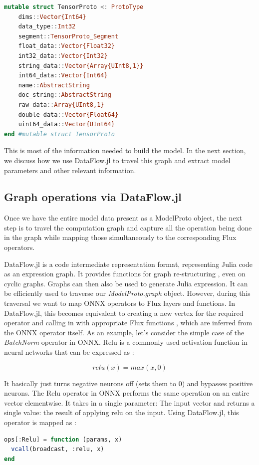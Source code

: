 \documentclass{juliacon}
\begin{document}
\begin{lstlisting}[language=julia]
mutable struct TensorProto <: ProtoType
    dims::Vector{Int64}
    data_type::Int32
    segment::TensorProto_Segment
    float_data::Vector{Float32}
    int32_data::Vector{Int32}
    string_data::Vector{Array{UInt8,1}}
    int64_data::Vector{Int64}
    name::AbstractString
    doc_string::AbstractString
    raw_data::Array{UInt8,1}
    double_data::Vector{Float64}
    uint64_data::Vector{UInt64}
end #mutable struct TensorProto
\end{lstlisting}

This is most of the information needed to build the model. In the next section, we discuss how we use DataFlow.jl to
travel this graph and extract model parameters and other relevant information.

\subsection{Graph operations via DataFlow.jl}

Once we have the entire model data present as a ModelProto object, the next step is to travel the computation 
graph and capture all the operation being done in the graph while mapping those simultaneously to the
corresponding Flux operators.  

DataFlow.jl \cite{DataFlow.jl} is a code intermediate representation format, representing Julia code as an expression graph. It provides functions for graph re-structuring , even on cyclic graphs. Graphs can then also be used to generate Julia expression. It can be efficiently used to traverse our \textit{ModelProto.graph} object. However,
during this traversal we want to map ONNX operators to Flux layers and functions. In DataFlow.jl, this becomes
equivalent to creating a new vertex for the required operator and calling in with appropriate Flux functions
, which are inferred from the ONNX operator itself. As an example, let's consider the simple case of the 
\textit{BatchNorm} operator in ONNX. Relu is a commonly used activation function in neural networks that can be 
expressed as :

\[ relu(x) = max(x, 0) \]

It basically just turns negative neurons off (sets them to 0) and bypasses positive neurons. The Relu operator
in ONNX performs the same operation on an entire vector elementwise. It takes in a single parameter: The input
vector and returns a single value: the result of applying relu on the input. Using DataFlow.jl, this 
operator is mapped as :
\newline \newline
\begin{lstlisting}[language=julia]
ops[:Relu] = function (params, x)
  vcall(broadcast, :relu, x)
end
\end{lstlisting}
\end{document}
